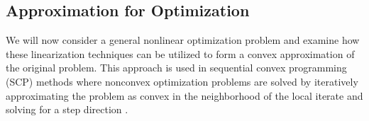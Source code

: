 

\subsection{Approximation for Optimization}
We will now consider a general nonlinear optimization problem and examine how these linearization techniques can be utilized to form a convex approximation of the original problem. This approach is used in sequential convex programming (SCP) methods where nonconvex optimization problems are solved by iteratively approximating the problem as convex in the neighborhood of the local iterate and solving for a step direction \cite{gill2005, nocedal2006, malyuta2021, pantoja1989}. 

